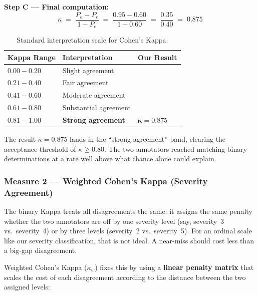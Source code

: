 \documentclass[12pt, a4paper]{article}
\begin{document}
\noindent\textbf{Step C --- Final computation:}
$$\boxed{\;\kappa \;=\; \frac{P_o - P_e}{1 - P_e} \;=\; \frac{0.95 - 0.60}{1 - 0.60} \;=\; \frac{0.35}{0.40} \;=\; 0.875\;}$$

\begin{table}[H]
\centering
\caption{Standard interpretation scale for Cohen's Kappa.}
\label{tab:kappa-scale}
\footnotesize
{}
\begin{tabular}{C{3cm} L{5cm} C{3cm}}
\toprule
{}
\color{white}\textbf{Kappa Range} &
\color{white}\textbf{Interpretation} &
\color{white}\textbf{Our Result} \\
\midrule
$0.00 - 0.20$ & Slight agreement & \\
$0.21 - 0.40$ & Fair agreement & \\
$0.41 - 0.60$ & Moderate agreement & \\
$0.61 - 0.80$ & Substantial agreement & \\
$\mathbf{0.81 - 1.00}$ & \textbf{Strong agreement} & $\boldsymbol{\kappa = 0.875}$ \\
\bottomrule
\end{tabular}
\end{table}

\noindent The result $\kappa = 0.875$ lands in the ``strong agreement'' band, clearing the acceptance threshold of $\kappa \geq 0.80$. The two annotators reached matching binary determinations at a rate well above what chance alone could explain.

\subsubsection{Measure 2 --- Weighted Cohen's Kappa (Severity Agreement)}

The binary Kappa treats all disagreements the same: it assigns the same penalty whether the two annotators are off by one severity level (say, severity~3 vs.~severity~4) or by three levels (severity~2 vs.~severity~5). For an ordinal scale like our severity classification, that is not ideal. A near-miss should cost less than a big-gap disagreement.

Weighted Cohen's Kappa ($\kappa_w$) fixes this by using a \textbf{linear penalty matrix} that scales the cost of each disagreement according to the distance between the two assigned levels:
\end{document}

